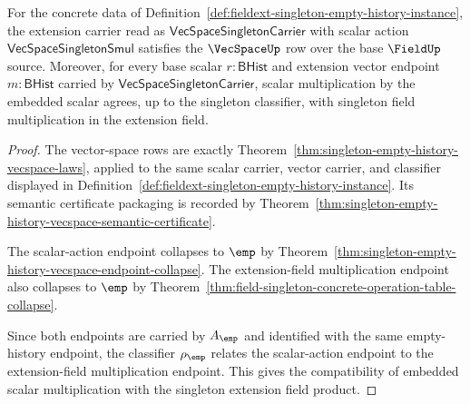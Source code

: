 \begin{theorem}
\label{thm:fieldext-singleton-vector-space-over-base}
For the concrete data of
Definition~\ref{def:fieldext-singleton-empty-history-instance}, the extension
carrier read as $\mathsf{VecSpaceSingletonCarrier}$ with scalar action
$\mathsf{VecSpaceSingletonSmul}$ satisfies the $\VecSpaceUp$ row over the base
$\FieldUp$ source. Moreover, for every base scalar $r:\mathsf{BHist}$ and
extension vector endpoint $m:\mathsf{BHist}$ carried by
$\mathsf{VecSpaceSingletonCarrier}$, scalar multiplication by the embedded
scalar agrees, up to the singleton classifier, with singleton field
multiplication in the extension field.
\end{theorem}
\begin{proof}
The vector-space rows are exactly
Theorem~\ref{thm:singleton-empty-history-vecspace-laws}, applied to the same
scalar carrier, vector carrier, and classifier displayed in
Definition~\ref{def:fieldext-singleton-empty-history-instance}. Its semantic
certificate packaging is recorded by
Theorem~\ref{thm:singleton-empty-history-vecspace-semantic-certificate}.

The scalar-action endpoint collapses to $\emp$ by
Theorem~\ref{thm:singleton-empty-history-vecspace-endpoint-collapse}. The
extension-field multiplication endpoint also collapses to $\emp$ by
Theorem~\ref{thm:field-singleton-concrete-operation-table-collapse}.

Since both endpoints are carried by $A_{\emp}$ and identified with the same
empty-history endpoint, the classifier $\rho_{\emp}$ relates the scalar-action
endpoint to the extension-field multiplication endpoint. This gives the
compatibility of embedded scalar multiplication with the singleton extension
field product.
\end{proof}

